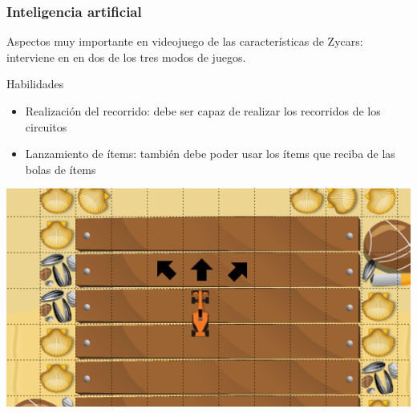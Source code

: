 \begin{frame}
    \frametitle{Inteligencia artificial}
    Aspectos muy importante en videojuego de las características
    de Zycars: interviene en en dos de los tres modos de
    juegos.

        \begin{block}{Habilidades}
            \begin{itemize}
                \item Realización del recorrido: debe ser capaz de realizar los 
                recorridos de los circuitos
                \item Lanzamiento de ítems: también debe poder usar los ítems que reciba de las bolas de ítems
            \end{itemize}
        \end{block}
        
        \begin{center}
                \includegraphics[scale=0.5]{imagenes/ia2.png}
        \end{center}
        

        
\end{frame}

